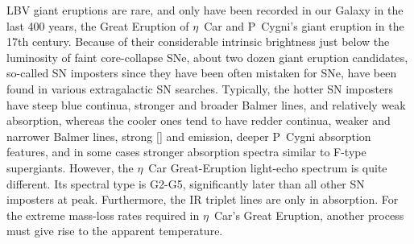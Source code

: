 LBV giant eruptions are rare, and only have been recorded in our
Galaxy in the last 400 years, the Great Eruption of $\eta$~Car and
P~Cygni's giant eruption in the 17th century.  Because of their
considerable intrinsic brightness just below the luminosity of faint
core-collapse SNe, about two dozen giant eruption candidates,
so-called SN imposters since they have been often mistaken for SNe,
have been found in various extragalactic SN
searches\cite{Goodrich89,Humphreys94,Humphreys99,VanDyk00,Vink09,Kashi10_ngc300}.
Typically, the hotter SN imposters have steep blue continua, stronger
and broader Balmer lines, and relatively weak absorption, whereas the
cooler ones tend to have redder continua, weaker and narrower Balmer
lines, strong [] and  emission, deeper P~Cygni
absorption features, and in some cases stronger absorption spectra
similar to F-type supergiants\cite{Smith11}.  However, the $\eta$~Car
Great-Eruption light-echo spectrum is quite different.  Its spectral
type is G2-G5, significantly later than all other SN imposters at
peak.  Furthermore, the  IR triplet lines are only in
absorption.  
For the extreme mass-loss rates required in $\eta$~Car's Great
Eruption, another process must give rise to the apparent temperature.


